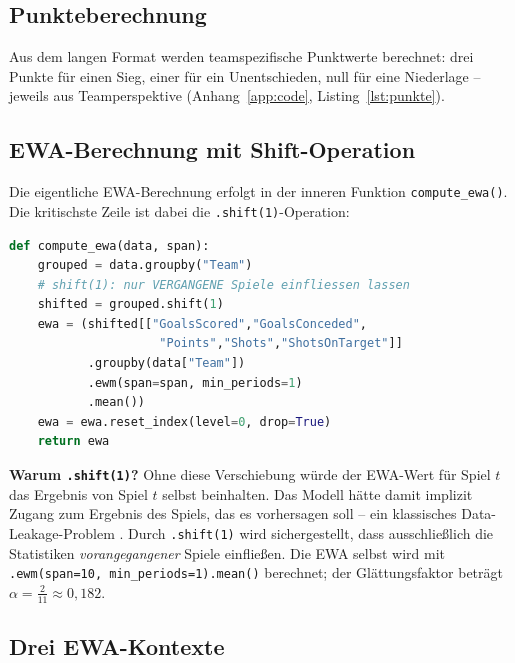 \subsection{Punkteberechnung}

Aus dem langen Format werden teamspezifische Punktwerte berechnet: drei
Punkte für einen Sieg, einer für ein Unentschieden, null für eine Niederlage
-- jeweils aus Teamperspektive (Anhang~\ref{app:code},
Listing~\ref{lst:punkte}).

\subsection{EWA-Berechnung mit Shift-Operation}

Die eigentliche EWA-Berechnung erfolgt in der inneren Funktion
\texttt{compute\_ewa()}. Die kritischste Zeile ist dabei die
\texttt{.shift(1)}-Operation:

\begin{lstlisting}[language=Python, caption={Kern der EWA-Berechnung mit Anti-Leakage-Shift},
                   label={lst:ewa-kern}]
def compute_ewa(data, span):
    grouped = data.groupby("Team")
    # shift(1): nur VERGANGENE Spiele einfliessen lassen
    shifted = grouped.shift(1)
    ewa = (shifted[["GoalsScored","GoalsConceded",
                     "Points","Shots","ShotsOnTarget"]]
           .groupby(data["Team"])
           .ewm(span=span, min_periods=1)
           .mean())
    ewa = ewa.reset_index(level=0, drop=True)
    return ewa
\end{lstlisting}

\textbf{Warum \texttt{.shift(1)}?} Ohne diese Verschiebung würde der
EWA-Wert für Spiel $t$ das Ergebnis von Spiel $t$ selbst beinhalten.
Das Modell hätte damit implizit Zugang zum Ergebnis des Spiels, das es
vorhersagen soll -- ein klassisches Data-Leakage-Problem
\cite{KaufmanRossetPerlich2012}. Durch \texttt{.shift(1)} wird
sichergestellt, dass ausschließlich die Statistiken
\emph{vorangegangener} Spiele einfließen. Die EWA selbst wird mit
\texttt{.ewm(span=10, min\_periods=1).mean()} berechnet; der
Glättungsfaktor beträgt $\alpha = \frac{2}{11} \approx 0{,}182$.

\subsection{Drei EWA-Kontexte}


